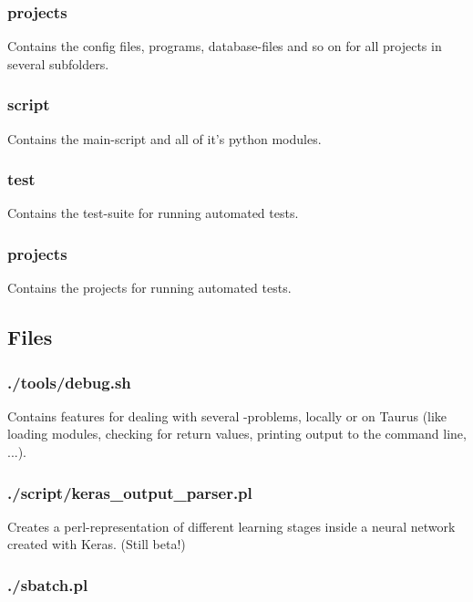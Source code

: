 \documentclass[]{scrartcl}
\begin{document}
\subsubsection{projects}

Contains the config files, programs, database-files and so on for all projects in several subfolders.

\subsubsection{script}

Contains the main-script and all of it's python modules.

\subsubsection{test}

Contains the test-suite for running automated tests.

\subsubsection{projects}

Contains the projects for running automated tests.

\subsection{Files}

\subsubsection{./tools/debug.sh}

Contains features for dealing with several -problems, locally or on Taurus (like loading modules,
checking for return values, printing output to the command line, ...).

\subsubsection{./script/keras\_output\_parser.pl}

Creates a perl-representation of different learning stages inside a neural network created with Keras. (Still beta!)

\subsubsection{./sbatch.pl}
\end{document}

